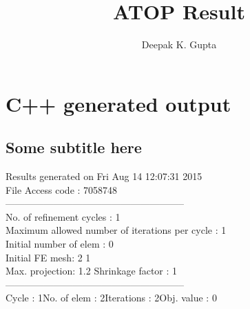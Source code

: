 \documentclass{article}
\title{ATOP Result}
\author{Deepak K. Gupta}
\begin{document}
\maketitle
\section{C++ generated output}
\subsection{Some subtitle here}
{\selectfont
Results generated  on Fri Aug 14 12:07:31 2015
\\File Access code : 7058748\\ 
--------------------------------------------------------\\ 
No. of refinement cycles : 1\\
Maximum allowed number of iterations per cycle : 1\\
Initial number of elem : 0\\ 
Initial FE mesh: 2 1\\ 
Max. projection: 1.2 Shrinkage factor : 1\\ 
--------------------------------------------------------\\ 
Cycle : 1\qquad No. of elem : 2\qquad Iterations : 2\qquad Obj. value : 0\qquad 
}
\begin{figure}[H] 
\centering 
\begin{subfigure}{.45\linewidth} \centering 
{}  
\end{subfigure}  
\hfill  
\begin{subfigure}{.45\linewidth} \centering 
{}  
\end{subfigure}  
\end{figure}  
\end{document}
